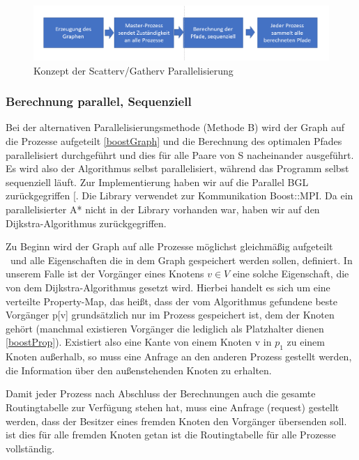 \documentclass[paper=A4,pagesize=auto,12pt,headinclude=true,footinclude=true,BCOR=0mm,DIV=calc]{scrartcl}
\begin{document}
	\label{parallelA}
		\begin{figure}[H]
			\includegraphics[scale = 0.80]{Prasentation/AblaufParallelA.png}
			\caption{Konzept der Scatterv/Gatherv Parallelisierung}
		\end{figure}
	
	\subsubsection{Berechnung parallel, Sequenziell}
	Bei der alternativen Parallelisierungsmethode (Methode B) wird der Graph auf die Prozesse aufgeteilt \ref{boostGraph} und die Berechnung des optimalen Pfades parallelisiert durchgeführt und dies für alle Paare von S nacheinander ausgeführt. Es wird also der Algorithmus selbst parallelisiert, während das Programm selbst sequenziell läuft. Zur Implementierung haben wir auf die Parallel BGL zurückgegriffen [\cite{ParallelBGL}. Die Library verwendet zur Kommunikation Boost::MPI. Da ein parallelisierter A* nicht in der Library vorhanden war, haben wir auf den Dijkstra-Algorithmus zurückgegriffen.
	
	Zu Beginn wird der Graph auf alle Prozesse möglichst gleichmäßig aufgeteilt \ und alle Eigenschaften die in dem Graph gespeichert werden sollen, definiert. In unserem Falle ist der Vorgänger eines Knotens $v \in V$ eine solche Eigenschaft, die von dem Dijkstra-Algorithmus gesetzt wird.
	Hierbei handelt es sich um eine verteilte Property-Map, das heißt, dass der vom Algorithmus gefundene beste Vorgänger p[v] grundsätzlich nur im Prozess gespeichert ist, dem der Knoten gehört (manchmal existieren Vorgänger die lediglich als Platzhalter dienen \ref{boostProp}). Existiert also eine Kante von einem Knoten v in  $p_{1}$ zu einem Knoten außerhalb, so muss eine Anfrage an den anderen Prozess gestellt werden, die Information über den außenstehenden Knoten zu erhalten.
	
	Damit jeder Prozess nach Abschluss der Berechnungen auch die gesamte Routingtabelle zur Verfügung stehen hat, muss eine Anfrage (request) gestellt werden, dass der Besitzer eines fremden Knoten den Vorgänger übersenden soll. ist dies für alle fremden Knoten getan ist die Routingtabelle für alle Prozesse vollständig.
	
\end{document}
